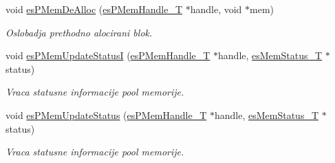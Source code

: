 \begin{DoxyCompactItemize}
void \hyperlink{group__mem__intf_gacd393e705fe5531cae380cc9b68f7a23}{es\-P\-Mem\-De\-Alloc} (\hyperlink{group__mem__intf_gaf82f01d26c4f6bc9a2b672a673b09ce2}{es\-P\-Mem\-Handle\-\_\-\-T} $\ast$handle, void $\ast$mem)
\begin{DoxyCompactList}\small\item\em Oslobadja prethodno alocirani blok. \end{DoxyCompactList}\item 
void \hyperlink{group__mem__intf_gab568f5b51f11f2bc315412c35bfc28e9}{es\-P\-Mem\-Update\-Status\-I} (\hyperlink{group__mem__intf_gaf82f01d26c4f6bc9a2b672a673b09ce2}{es\-P\-Mem\-Handle\-\_\-\-T} $\ast$handle, \hyperlink{group__mem__intf_ga0eb568b68247d93e2db804a681de0e9e}{es\-Mem\-Status\-\_\-\-T} $\ast$status)
\begin{DoxyCompactList}\small\item\em Vraca statusne informacije pool memorije. \end{DoxyCompactList}\item 
void \hyperlink{group__mem__intf_ga8148d4ad98ed5e9ecc04b7983433555e}{es\-P\-Mem\-Update\-Status} (\hyperlink{group__mem__intf_gaf82f01d26c4f6bc9a2b672a673b09ce2}{es\-P\-Mem\-Handle\-\_\-\-T} $\ast$handle, \hyperlink{group__mem__intf_ga0eb568b68247d93e2db804a681de0e9e}{es\-Mem\-Status\-\_\-\-T} $\ast$status)
\begin{DoxyCompactList}\small\item\em Vraca statusne informacije pool memorije. \end{DoxyCompactList}\end{DoxyCompactItemize}
